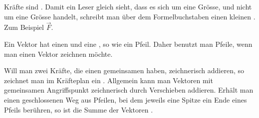 
\begin{aufgabe}
\StartLueckentext

Kräfte sind \gl. Damit ein Leser gleich sieht, dass es sich um eine \gl Grösse, und nicht um eine \gl Grösse handelt,
schreibt man über dem Formelbuchstaben einen kleinen \gl. Zum Beispiel $\vec{F}$.

Ein Vektor hat einen \gl und eine \gl, so wie ein Pfeil. Daher benutzt man Pfeile, wenn man einen Vektor zeichnen möchte.

Will man zwei Kräfte, die einen gemeinsamen \gl haben, zeichnerisch addieren, so zeichnet man im Kräfteplan ein \gl .
Allgemein kann man Vektoren mit gemeinsamen Angriffspunkt zeichnerisch durch \gl Verschieben addieren.
Erhält man einen geschlossenen Weg aus Pfeilen, bei dem jeweils eine Spitze ein Ende eines Pfeils berühren, so ist die Summe der Vektoren \gl.

\StoppLueckentext
\end{aufgabe}

